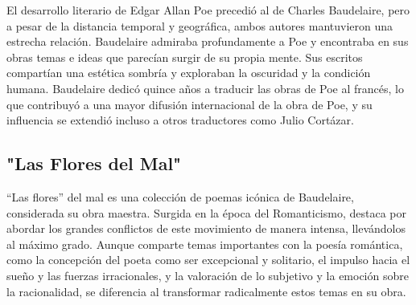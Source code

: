 \documentclass{article}
\begin{document}
El desarrollo literario de Edgar Allan Poe precedió al de Charles Baudelaire, pero a pesar de la distancia temporal y geográfica, ambos autores mantuvieron una estrecha relación. Baudelaire admiraba profundamente a Poe y encontraba en sus obras temas e ideas que parecían surgir de su propia mente. Sus escritos compartían una estética sombría y exploraban la oscuridad y la condición humana. Baudelaire dedicó quince años a traducir las obras de Poe al francés, lo que contribuyó a una mayor difusión internacional de la obra de Poe, y su influencia se extendió incluso a otros traductores como Julio Cortázar. 

\subsection{"Las Flores del Mal"}

``Las flores'' del mal es una colección de poemas icónica de Baudelaire, considerada su obra maestra. Surgida en la época del Romanticismo, destaca por abordar los grandes conflictos de este movimiento de manera intensa, llevándolos al máximo grado. Aunque comparte temas importantes con la poesía romántica, como la concepción del poeta como ser excepcional y solitario, el impulso hacia el sueño y las fuerzas irracionales, y la valoración de lo subjetivo y la emoción sobre la racionalidad, se diferencia al transformar radicalmente estos temas en su obra.
\end{document}
